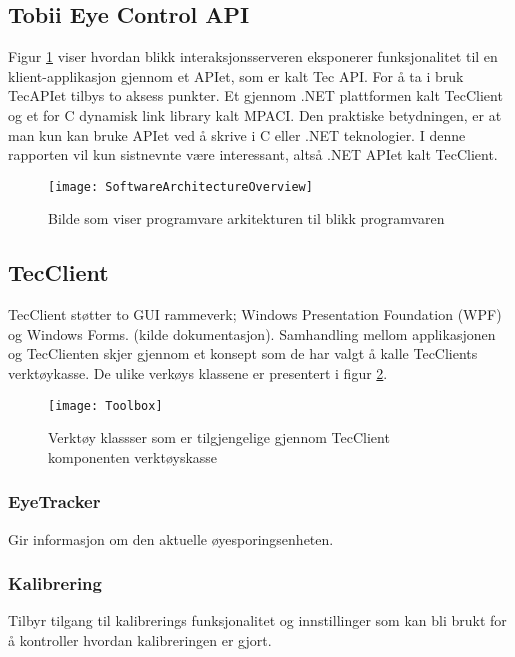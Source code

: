 \subsection{Tobii Eye Control API }

Figur \ref{fig:overview} viser hvordan blikk interaksjonsserveren eksponerer funksjonalitet til en klient-applikasjon gjennom et APIet, som er kalt Tec API. For å ta i bruk TecAPIet tilbys to aksess punkter. Et gjennom .NET plattformen kalt TecClient og et for C dynamisk link library kalt MPACI.  Den praktiske betydningen, er at man kun kan bruke APIet ved å skrive i C eller .NET teknologier. I denne rapporten vil kun sistnevnte være interessant, altså .NET APIet kalt TecClient.


\begin{figure}[ht!]
\centering
\texttt{[image: SoftwareArchitectureOverview]}
\caption{Bilde som viser programvare arkitekturen til blikk programvaren}
\label{fig:overview}
\end{figure}


\subsection{TecClient}

TecClient støtter to GUI rammeverk; Windows Presentation Foundation (\gls{WPF}) og Windows Forms. 
 (kilde dokumentasjon).  Samhandling mellom applikasjonen og TecClienten skjer gjennom et konsept som de har valgt å kalle TecClients verktøykasse. De ulike verkøys klassene er presentert i figur \ref{fig:toolbox}. 

\begin{figure}[ht!]
\centering
\texttt{[image: Toolbox]}
\caption{Verktøy klassser som er tilgjengelige gjennom TecClient komponenten verktøyskasse}
\label{fig:toolbox}
\end{figure}


\subsubsection{EyeTracker}
Gir informasjon om den aktuelle øyesporingsenheten.

\subsubsection{Kalibrering}
Tilbyr tilgang til kalibrerings funksjonalitet og innstillinger som kan bli brukt for å kontroller hvordan kalibreringen er gjort.

